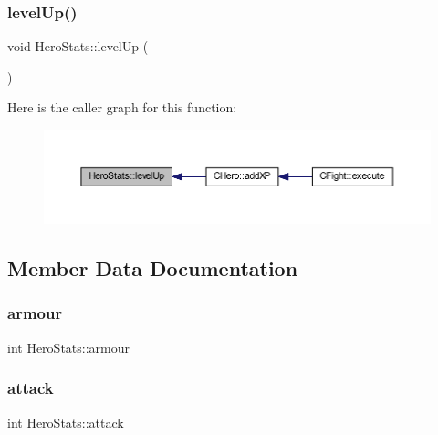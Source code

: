 \subsubsection{\texorpdfstring{level\+Up()}{levelUp()}}
{\footnotesize\ttfamily void Hero\+Stats\+::level\+Up (\begin{DoxyParamCaption}{ }\end{DoxyParamCaption})}

Here is the caller graph for this function\+:\nopagebreak
\begin{figure}[H]
\begin{center}
\leavevmode
\includegraphics[width=350pt]{struct_hero_stats_af28870ab75d59129709abd0b84670a43_icgraph}
\end{center}
\end{figure}


\subsection{Member Data Documentation}
\mbox{\label{struct_hero_stats_af664c2d0a61bcf3ca19191f73cf8bb06}} 
\subsubsection{\texorpdfstring{armour}{armour}}
{\footnotesize\ttfamily int Hero\+Stats\+::armour}

\mbox{\label{struct_hero_stats_a0e7d6e8ea8364bb0aed65dc149c5a8c4}} 
\subsubsection{\texorpdfstring{attack}{attack}}
{\footnotesize\ttfamily int Hero\+Stats\+::attack}

\mbox{\label{struct_hero_stats_a37ae89eeb0fe2923a75e1e5fde2a8f04}} 
